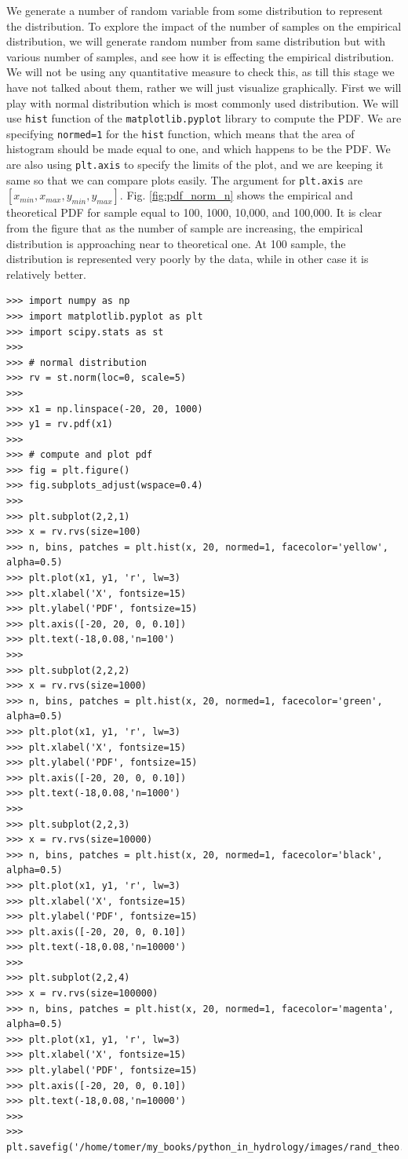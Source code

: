 \documentclass[10pt]{book}
\begin{document}
{We generate a number of random variable from some distribution to represent the distribution. To explore the impact of the number of samples on the empirical distribution, we will generate random number from same distribution but with various number of samples, and see how it is effecting the empirical distribution. We will not be using any quantitative measure to check this, as till this stage we have not talked about them, rather we will just visualize graphically. First we will play with normal distribution which is most commonly used distribution. We will use \verb"hist" function of the \verb"matplotlib.pyplot" library to compute the PDF. We are specifying \verb"normed=1" for the \verb"hist" function, which means that the area of histogram should be made equal to one, and which happens to be the PDF. We are also using \verb"plt.axis" to specify the limits of the plot, and we are keeping it same so that we can compare plots easily. The argument for \verb"plt.axis" are $[x_{min}, x_{max}, y_{min}, y_{max}]
$.  Fig. \ref{fig:pdf_norm_n} shows the empirical and theoretical PDF for sample equal to 100, 1000, 10,000, and 100,000. It is clear from the figure that as the number of sample are increasing, the empirical distribution is approaching near to theoretical one. At 100 sample, the distribution is represented very poorly by the data, while in other case it is relatively better.  
\beforeverb \begin{verbatim}
>>> import numpy as np
>>> import matplotlib.pyplot as plt
>>> import scipy.stats as st
>>> 
>>> # normal distribution 
>>> rv = st.norm(loc=0, scale=5)
>>> 
>>> x1 = np.linspace(-20, 20, 1000)
>>> y1 = rv.pdf(x1)
>>> 
>>> # compute and plot pdf
>>> fig = plt.figure()
>>> fig.subplots_adjust(wspace=0.4)
>>> 
>>> plt.subplot(2,2,1)
>>> x = rv.rvs(size=100)
>>> n, bins, patches = plt.hist(x, 20, normed=1, facecolor='yellow', alpha=0.5)
>>> plt.plot(x1, y1, 'r', lw=3)
>>> plt.xlabel('X', fontsize=15)
>>> plt.ylabel('PDF', fontsize=15)
>>> plt.axis([-20, 20, 0, 0.10])
>>> plt.text(-18,0.08,'n=100')
>>> 
>>> plt.subplot(2,2,2)
>>> x = rv.rvs(size=1000)
>>> n, bins, patches = plt.hist(x, 20, normed=1, facecolor='green', alpha=0.5)
>>> plt.plot(x1, y1, 'r', lw=3)
>>> plt.xlabel('X', fontsize=15)
>>> plt.ylabel('PDF', fontsize=15)
>>> plt.axis([-20, 20, 0, 0.10])
>>> plt.text(-18,0.08,'n=1000')
>>> 
>>> plt.subplot(2,2,3)
>>> x = rv.rvs(size=10000)
>>> n, bins, patches = plt.hist(x, 20, normed=1, facecolor='black', alpha=0.5)
>>> plt.plot(x1, y1, 'r', lw=3)
>>> plt.xlabel('X', fontsize=15)
>>> plt.ylabel('PDF', fontsize=15)
>>> plt.axis([-20, 20, 0, 0.10])
>>> plt.text(-18,0.08,'n=10000')
>>> 
>>> plt.subplot(2,2,4)
>>> x = rv.rvs(size=100000)
>>> n, bins, patches = plt.hist(x, 20, normed=1, facecolor='magenta', alpha=0.5)
>>> plt.plot(x1, y1, 'r', lw=3)
>>> plt.xlabel('X', fontsize=15)
>>> plt.ylabel('PDF', fontsize=15)
>>> plt.axis([-20, 20, 0, 0.10])
>>> plt.text(-18,0.08,'n=10000')
>>> 
>>> plt.savefig('/home/tomer/my_books/python_in_hydrology/images/rand_theo.png')
\end{verbatim} \afterverb

}
\end{document}
